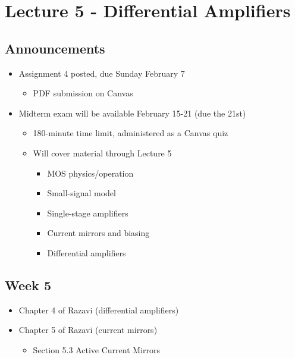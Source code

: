 \documentclass[11pt]{article}
\providecommand{\tightlist}{%
      \setlength{\itemsep}{0pt}\setlength{\parskip}{0pt}}
\begin{document}
    \hypertarget{lecture-5---differential-amplifiers}{%
\section{Lecture 5 - Differential
Amplifiers}\label{lecture-5---differential-amplifiers}}

    \hypertarget{announcements}{%
\subsection{Announcements}\label{announcements}}

    \begin{itemize}
\tightlist
\item
  Assignment 4 posted, due Sunday February 7

  \begin{itemize}
  \tightlist
  \item
    PDF submission on Canvas
  \end{itemize}
\item
  Midterm exam will be available February 15-21 (due the 21st)

  \begin{itemize}
  \tightlist
  \item
    180-minute time limit, administered as a Canvas quiz
  \item
    Will cover material through Lecture 5

    \begin{itemize}
    \tightlist
    \item
      MOS physics/operation
    \item
      Small-signal model
    \item
      Single-stage amplifiers
    \item
      Current mirrors and biasing
    \item
      Differential amplifiers
    \end{itemize}
  \end{itemize}
\end{itemize}

    \hypertarget{week-5}{%
\subsection{Week 5}\label{week-5}}

    \begin{itemize}
\tightlist
\item
  Chapter 4 of Razavi (differential amplifiers)
\item
  Chapter 5 of Razavi (current mirrors)

  \begin{itemize}
  \tightlist
  \item
    Section 5.3 Active Current Mirrors
  \end{itemize}
\end{itemize}
\end{document}
